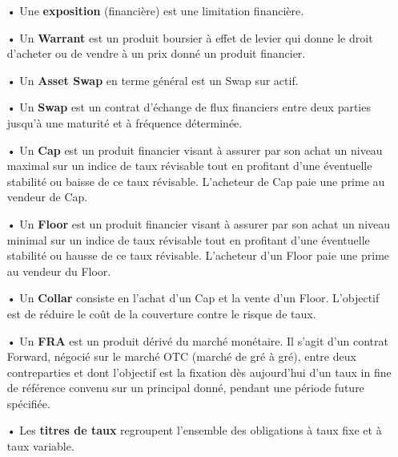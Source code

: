 \documentclass[french,12pt,a4paper]{article}
\begin{document}
\begin{itemize}
\item[•]
Une \textbf{exposition} (financière) est une limitation financière.\\

\item[•]
Un \textbf{Warrant} est un produit boursier à effet de levier qui donne le droit d'acheter ou de vendre à un prix donné un produit financier.\\

\item[•]
Un \textbf{Asset Swap} en terme général est un Swap sur actif.\\

\item[•]
Un \textbf{Swap} est un contrat d'échange de flux financiers entre deux parties jusqu'à une maturité et à fréquence déterminée.\\

\item[•]
Un \textbf{Cap} est un produit financier visant à assurer par son achat un niveau maximal sur un indice de taux révisable tout en profitant d'une éventuelle stabilité ou baisse de ce taux révisable. L'acheteur de Cap paie une prime au vendeur de Cap.\\

\item[•]
Un \textbf{Floor} est un produit financier visant à assurer par son achat un niveau minimal sur un indice de taux révisable tout en profitant d'une éventuelle stabilité ou hausse de ce taux révisable. L'acheteur d'un Floor paie une prime au vendeur du Floor.\\

\item[•]
Un \textbf{Collar} consiste en l'achat d'un Cap et la vente d'un Floor. L'objectif est de réduire le coût de la couverture contre le risque de taux.\\

\item[•]
Un \textbf{FRA} est un produit dérivé du marché monétaire. Il s'agit d'un contrat Forward, négocié sur le marché OTC (marché de gré à gré), entre deux contreparties et dont l'objectif est la fixation dès aujourd'hui d'un taux in fine de référence convenu sur un principal donné, pendant une période future spécifiée.\\

\item[•]
Les \textbf{titres de taux} regroupent l'ensemble des obligations à taux fixe et à taux variable. \\


\end{itemize}
\end{document}
